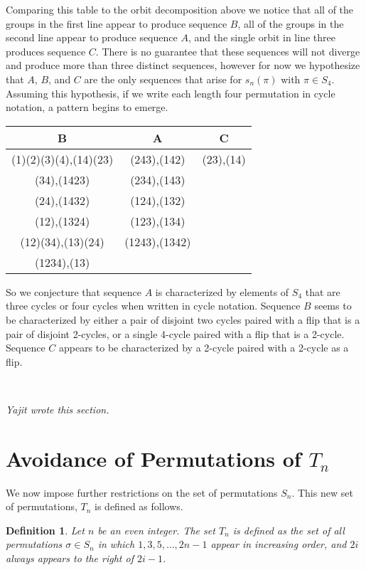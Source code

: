 \documentclass[11pt,letterpaper,twoside,english]{article}
\theoremstyle{theorem}
\newtheorem{definition}[theorem]{Definition}
\theoremstyle{remark}
\begin{document}
Comparing this table to the orbit decomposition above we notice that all of the groups in the first line appear to produce sequence $B$, all of the groups in the second line appear to produce sequence $A$, and the single orbit in line three produces sequence $C$. There is no guarantee that these sequences will not diverge and produce more than three distinct sequences, however for now we hypothesize that $A$, $B$, and $C$ are the only sequences that arise for $s_n(\pi)$ with $\pi\in S_4$. Assuming this hypothesis, if we write each length four permutation in cycle notation, a pattern begins to emerge. 

\begin{center}
\begin{tabular}{|c|c|c|}
B &A&C\\
\hline
(1)(2)(3)(4),(14)(23)&(243),(142)&(23),(14)\\
(34),(1423)&(234),(143)&\\
(24),(1432)&(124),(132)&\\
(12),(1324)&(123),(134)&\\
(12)(34),(13)(24)&(1243),(1342)&\\
(1234),(13)&&\\
\end{tabular}
\end{center}

So we conjecture that sequence $A$ is characterized by elements of $S_4$ that are three cycles or four cycles when written in cycle notation. Sequence $B$ seems to be characterized by either a pair of disjoint two cycles paired with a flip that is a pair of disjoint 2-cycles, or a single 4-cycle paired with a flip that is a 2-cycle. Sequence $C$ appears to be characterized by a 2-cycle paired with a 2-cycle as a flip. 

\

\emph{Yajit wrote this section.}

\section{Avoidance of Permutations of $T_n$}
\label{Tn}
We now impose further restrictions on the set of permutations $S_n$. This new set of permutations, $T_n$ is defined as follows.

\begin{definition}
Let $n$ be an even integer. The set $T_n$ is defined as the set of all permutations $\sigma \in S_n$ in which $1,3,5,\ldots,2n-1$ appear in increasing order, and $2i$ always appears to the right of $2i-1$.
\end{definition}
\end{document}
